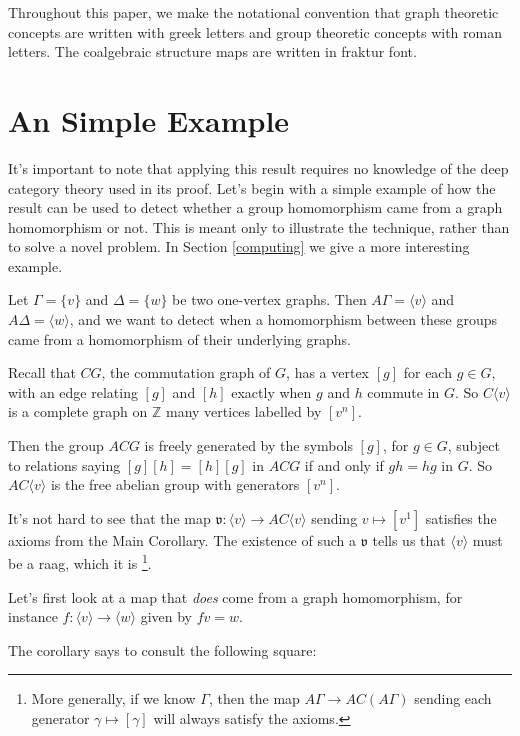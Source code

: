\documentclass[microtype]{gtpart}
\theoremstyle{definition}
\theoremstyle{theorem}
\begin{document}
  Throughout this paper, we make the notational convention that graph theoretic 
  concepts are written with greek letters and group theoretic concepts with 
  roman letters. The coalgebraic structure maps are written in fraktur font.

\section{An Simple Example}
\label{eg}

It's important to note that applying this result requires no knowledge of 
the deep category theory used in its proof. Let's begin with a simple example
of how the result can be used to detect whether a group 
homomorphism came from a graph homomorphism or not. This is meant only to 
illustrate the technique, rather than to solve a novel problem. In Section
\ref{computing} we give a more interesting example.

Let $\Gamma = \{ v \}$ and $\Delta = \{ w \}$ be two one-vertex graphs.
Then $A \Gamma = \langle v \rangle$ and $A \Delta = \langle w \rangle$,
and we want to detect when a homomorphism between these groups came from a
homomorphism of their underlying graphs.

Recall that $CG$, the commutation graph of $G$, has a vertex $[g]$ for 
each $g \in G$, with an edge relating $[g]$ and $[h]$ exactly when 
$g$ and $h$ commute in $G$. So $C \langle v \rangle$ is a complete 
graph on $\mathbb{Z}$ many vertices labelled by $[v^n]$.

Then the group $ACG$ is freely generated by the symbols $[g]$, for $g \in G$,
subject to relations saying $[g][h] = [h][g]$ in $ACG$ if and only if 
$gh = hg$ in $G$. So $AC \langle v \rangle$ is the free abelian group with 
generators $[v^n]$.

It's not hard to see that the map 
$\mathfrak{v} : \langle v \rangle \to AC \langle v \rangle$
sending $v \mapsto [v^1]$ satisfies the axioms from the Main Corollary. 
The existence of such a $\mathfrak{v}$ tells us that 
$\langle v \rangle$ must be a raag, which it is%
\footnote{More generally, if we know $\Gamma$, then the map 
$A\Gamma \to AC(A\Gamma)$ sending each generator $\gamma \mapsto [\gamma]$ 
will always satisfy the axioms.}.

\bigskip

Let's first look at a map that \emph{does} come from a graph homomorphism,
for instance $f : \langle v \rangle \to \langle w \rangle$ given by $fv = w$.

The corollary says to consult the following square:
\end{document}
